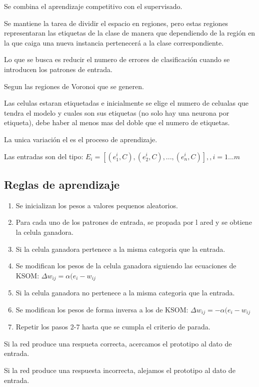 \documentclass[12pt, twoside, openright]{report} %
\begin{document}
Se combina el aprendizaje competitivo con el supervisado.

Se mantiene la tarea de dividir el espacio en regiones, pero estas regiones representaran las etiquetas de la clase de manera que dependiendo de la región en la que caiga una nueva instancia pertenecerá a la clase correspondiente.

Lo que se busca es reducir el numero de errores de clasificación cuando se introducen los patrones de entrada.

Segun las regiones de Voronoi que se generen.

Las celulas estaran etiquetadas e inicialmente se elige el numero de celualas que tendra el modelo y cuales son sus etiquetas (no solo hay una neurona por etiqueta), debe haber al menos mas del doble que el numero de etiquetas.

La unica variación el es el proceso de aprendizaje.

Las entradas son del tipo: $E_i = [(e_1^i, C),(e_2^i, C), ..., (e_n^i, C)],, i = 1...m$

\subsection{Reglas de aprendizaje}
\begin{enumerate}
	\item Se inicializan los pesos a valores pequenos aleatorios.
	\item Para cada uno de los patrones de entrada, se propada por l ared y se obtiene la celula ganadora.
	\item Si la celula ganadora pertenece a la misma categoria que la entrada.
	\item Se modifican los pesos de la celula ganadora siguiendo las ecuaciones de KSOM: $\Delta w_{ij} = \alpha (e_i - w_{ij}$
	\item Si la celula ganadora no pertenece a la misma categoria que la entrada.
	\item Se modifican los pesos de forma inversa a los de KSOM: $\Delta w_{ij} = - \alpha (e_i - w_{ij}$
	\item Repetir los pasos 2-7 hasta que se cumpla el criterio de parada.
\end{enumerate}

Si la red produce una respueta correcta, acercamos el prototipo al dato de entrada.

Si la red produce una respuesta incorrecta, alejamos el prototipo al dato de entrada.
\end{document}

